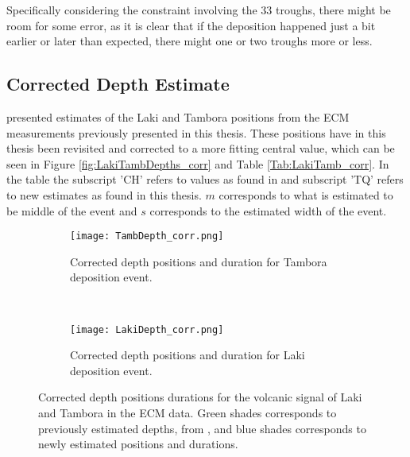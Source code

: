 \documentclass[../../CompleteThesis2/Complete_2ndDraft]{subfiles}
\begin{document}
Specifically considering the constraint involving the 33 troughs, there might be room for some error, as it is clear that if the deposition happened just a bit earlier or later than expected, there might one or two troughs more or less. 

\subsection[Corrected Depth]{Corrected Depth Estimate}
\label{Subsec:Data_VolcanicHorizons_CorrDepthEst}

\cite[Clausen \& Hammer, 1988]{ClausenHammer1988} presented estimates of the Laki and Tambora positions from the ECM measurements previously presented in this thesis. These positions have in this thesis been revisited and corrected to a more fitting central value, which can be seen in Figure \ref{fig:LakiTambDepths_corr} and Table \ref{Tab:LakiTamb_corr}. In the table the subscript 'CH' refers to values as found in \cite[Clausen \& Hammer, 1988]{ClausenHammer1988} and subscript 'TQ' refers to new estimates as found in this thesis. $m$ corresponds to what is estimated to be middle of the event and $s$ corresponds to the estimated width of the event.

\begin{figure}[h]
	\centering
	\begin{subfigure}{.45\textwidth}
		\centering
		\texttt{[image: TambDepth\_corr.png]}
		\caption[Corrected Tambora locations.]{\footnotesize Corrected depth positions and duration for Tambora deposition event.}
		\label{fig:DATA_TambDepth_corr}
	\end{subfigure}
	~
	\begin{subfigure}{.45\textwidth}
		\centering
		\texttt{[image: LakiDepth\_corr.png]}
		\caption[Corrected Laki locations.]{\footnotesize Corrected depth positions and duration for Laki deposition event.}
		\label{fig:DATA_LakiDepth_corr}
	\end{subfigure}
	\caption[Corrected depth positions of Laki and Tambora events.]{\small Corrected depth positions durations for the volcanic signal of Laki and Tambora in the ECM data. Green shades corresponds to previously estimated depths, from \cite[Clausen \& Hammer, 1988]{ClausenHammer1988}, and blue shades corresponds to newly estimated positions and durations.}
	\label{fig:DATA_LakiTambDepths_corr}
\end{figure}
\end{document}
